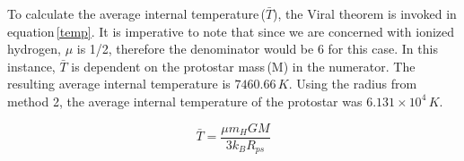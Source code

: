 \documentclass[onecolumn]{aastex6}
\begin{document}
To calculate the average internal temperature\,($\bar{T}$), the Viral theorem is invoked in equation\,\ref{temp}. It is imperative to note that since we are concerned with ionized hydrogen, $\mu$ is 1/2, therefore the denominator would be 6 for this case. In this instance, $\bar{T}$ is dependent on the protostar mass\,(M) in the numerator. The resulting average internal temperature is \st{$\boxed{7460.66\,K}$}. Using the radius from method 2, the average internal temperature of the protostar was $\boxed{6.131\times10^{4}\,K}$.


\begin{equation}
\bar{T} = \frac{\mu m_H G M}{3 k_B R_{ps}}
\label{temp}
\end{equation}











\end{document}
